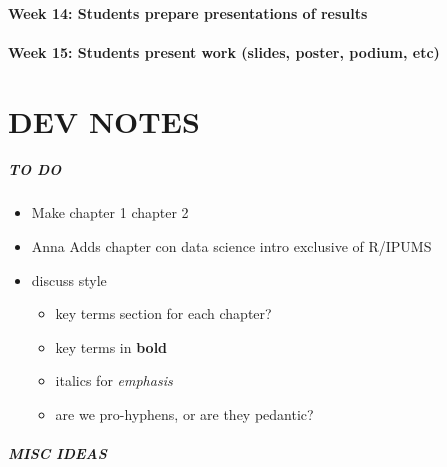 \documentclass[
]{book}
\providecommand{\tightlist}{%
  \setlength{\itemsep}{0pt}\setlength{\parskip}{0pt}}
\begin{document}
\hypertarget{week-14-students-prepare-presentations-of-results}{%
\subsubsection*{Week 14: Students prepare presentations of results}\label{week-14-students-prepare-presentations-of-results}}

\hypertarget{week-15-students-present-work-slides-poster-podium-etc}{%
\subsubsection*{Week 15: Students present work (slides, poster, podium, etc)}\label{week-15-students-present-work-slides-poster-podium-etc}}

\hypertarget{dev-notes}{%
\chapter*{DEV NOTES}\label{dev-notes}}

\hypertarget{to-do}{%
\paragraph{TO DO}\label{to-do}}

\begin{itemize}
\item
  Make chapter 1 chapter 2
\item
  Anna Adds chapter con data science intro exclusive of R/IPUMS
\item
  discuss style

  \begin{itemize}
  \tightlist
  \item
    key terms section for each chapter?
  \item
    key terms in \textbf{bold}
  \item
    italics for \emph{emphasis}
  \item
    are we pro-hyphens, or are they pedantic?
  \end{itemize}
\end{itemize}

\hypertarget{misc-ideas}{%
\paragraph{MISC IDEAS}\label{misc-ideas}}
\end{document}
